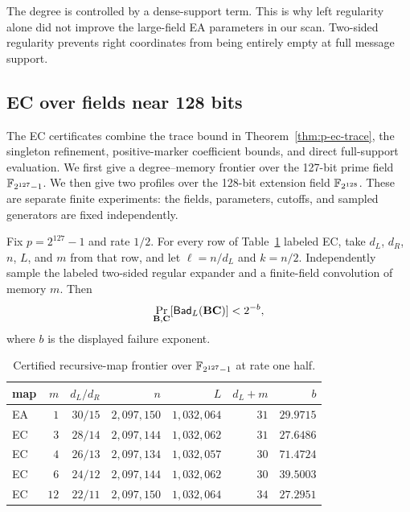 The degree is controlled by a dense-support term.  This is why left
regularity alone did not improve the large-field EA parameters in our scan.
Two-sided regularity prevents right coordinates from being entirely empty at
full message support.

\subsection{EC over fields near 128 bits}

The EC certificates combine the trace bound in
Theorem~\ref{thm:p-ec-trace}, the singleton refinement, positive-marker
coefficient bounds, and direct full-support evaluation.
We first give a degree--memory frontier over the 127-bit prime field
$\mathbb F_{2^{127}-1}$.  We then give two profiles over the 128-bit extension field
$\mathbb F_{2^{128}}$.  These are separate finite experiments: the fields,
parameters, cutoffs, and sampled generators are fixed independently.

\begin{theorem}
\label{thm:p-ec-certificates}
Fix $p=2^{127}-1$ and rate $1/2$.  For every row of
Table~\ref{tab:p-ec-frontier} labeled EC, take $d_L$, $d_R$, $n$, $L$, and
$m$ from that row, and let $\ell=n/d_L$ and $k=n/2$.  Independently sample
the labeled two-sided regular expander and a finite-field convolution of
memory $m$.  Then
\begin{equation}
 \Pr_{\mathbf B,\mathbf C}[\mathsf{Bad}_L(\mathbf B\mathbf C)]<2^{-b},
\end{equation}
where $b$ is the displayed failure exponent.
\end{theorem}

\begin{table}[ht]
\centering
\caption{Certified recursive-map frontier over $\mathbb F_{2^{127}-1}$ at rate one half.}
\label{tab:p-ec-frontier}
\begin{tabular}{@{}lrrrrrr@{}}
\toprule
map & $m$ & $d_L/d_R$ & $n$ & $L$ & $d_L+m$ & $b$ \\
\midrule
EA & $1$  & $30/15$ & $2{,}097{,}150$ & $1{,}032{,}064$ & $31$ & $29.9715$ \\
EC & $3$  & $28/14$ & $2{,}097{,}144$ & $1{,}032{,}062$ & $31$ & $27.6486$ \\
EC & $4$  & $26/13$ & $2{,}097{,}134$ & $1{,}032{,}057$ & $30$ & $71.4724$ \\
EC & $6$  & $24/12$ & $2{,}097{,}144$ & $1{,}032{,}062$ & $30$ & $39.5003$ \\
EC & $12$ & $22/11$ & $2{,}097{,}150$ & $1{,}032{,}064$ & $34$ & $27.2951$ \\
\bottomrule
\end{tabular}
\end{table}

